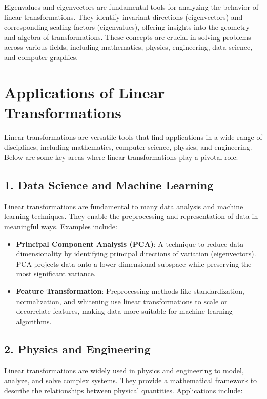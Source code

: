 \documentclass[11pt]{article}
\begin{document}
Eigenvalues and eigenvectors are fundamental tools for analyzing the behavior of linear transformations. They identify invariant directions (eigenvectors) and corresponding scaling factors (eigenvalues), offering insights into the geometry and algebra of transformations. These concepts are crucial in solving problems across various fields, including mathematics, physics, engineering, data science, and computer graphics.



\section{\textbf{Applications of Linear Transformations}} 

Linear transformations are versatile tools that find applications in a wide range of disciplines, including mathematics, computer science, physics, and engineering. Below are some key areas where linear transformations play a pivotal role:


\subsection*{1. Data Science and Machine Learning}

Linear transformations are fundamental to many data analysis and machine learning techniques. They enable the preprocessing and representation of data in meaningful ways. Examples include:

\begin{itemize}
    \item \textbf{Principal Component Analysis (PCA)}:
    A technique to reduce data dimensionality by identifying principal directions of variation (eigenvectors). PCA projects data onto a lower-dimensional subspace while preserving the most significant variance.

    \item \textbf{Feature Transformation}:
    Preprocessing methods like standardization, normalization, and whitening use linear transformations to scale or decorrelate features, making data more suitable for machine learning algorithms.
\end{itemize}


\subsection*{2. Physics and Engineering}

Linear transformations are widely used in physics and engineering to model, analyze, and solve complex systems. They provide a mathematical framework to describe the relationships between physical quantities. Applications include:
\end{document}
